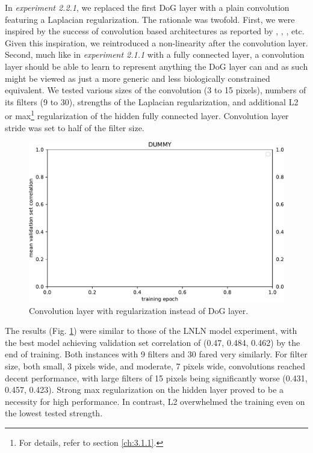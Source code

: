 In \textit{experiment 2.2.1}, we replaced the first DoG layer with a plain convolution featuring a Laplacian regularization. The rationale was twofold. First, we were inspired by the success of convolution based architectures as reported by \cite{klidnt}, \cite{ecker}, \cite{Walke506956}, etc. Given this inspiration, we reintroduced a non-linearity after the convolution layer. Second, much like in \textit{experiment 2.1.1} with a fully connected layer, a convolution layer should be able to learn to represent anything the DoG layer can and as such might be viewed as just a more generic and less biologically constrained equivalent. We tested various sizes of the convolution (3 to 15 pixels), numbers of its filters (9 to 30), strengths of the Laplacian regularization, and additional L2 or max\footnote{For details, refer to section \ref{ch:3.1.1}.} regularization of the hidden fully connected layer. Convolution layer stride was set to half of the filter size.

\begin{figure}[H]
    \centering
    \includegraphics[width=1\textwidth]{../figures/05_dummy}
    \caption[Experiment 5.2.2.1]{Convolution layer with regularization instead of DoG layer.}
    \label{fig:5.2.2.1}
\end{figure}

The results (Fig. \ref{fig:5.2.2.1}) were similar to those of the LNLN model experiment, with the best model achieving validation set correlation of (0.47, 0.484, 0.462) by the end of training. Both instances with 9 filters and 30 fared very similarly. For filter size, both small, 3 pixels wide, and moderate, 7 pixels wide, convolutions reached decent performance, with large filters of 15 pixels being significantly worse (0.431, 0.457, 0.423). Strong max regularization on the hidden layer proved to be a necessity for high performance. In contrast, L2 overwhelmed the training even on the lowest tested strength. 

